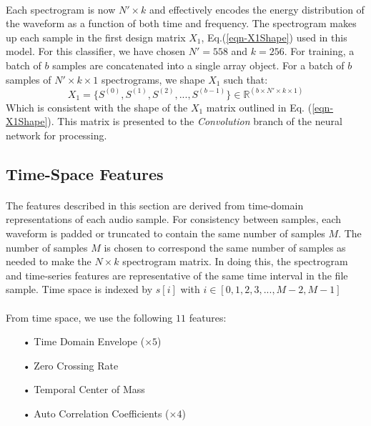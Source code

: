\documentclass[12pt,letterpaper]{article}
\begin{document}
\paragraph*{}Each spectrogram is now $N' \times k$ and effectively encodes the energy distribution of the waveform as a function of both time and frequency. The spectrogram makes up each sample in the first design matrix $X_1$, Eq.(\ref{eqn-X1Shape}) used in this model. For this classifier, we have chosen $N' = 558$ and $k = 256$. For training, a batch of $b$ samples are concatenated into a single array object. For a batch of $b$ samples of $N' \times k \times 1$ spectrograms, we shape $X_1$ such that:
\begin{equation}
\label{eqn-X1}
X_1 = \big\{ S^{(0)},S^{(1)},S^{(2)}, ... , S^{(b-1)} \big\} \in \mathbb{R}^{(b \times N' \times k \times 1)}
\end{equation}
Which is consistent with the shape of the $X_1$ matrix outlined in Eq. (\ref{eqn-X1Shape}). This matrix is presented to the \textit{Convolution} branch of the neural network for processing.


\subsection{Time-Space Features}
\label{subsec-TimeFeatures}

\paragraph*{}The features described in this section are derived from time-domain representations of each audio sample.  For consistency between samples, each waveform is padded or truncated to contain the same number of samples $M$. The number of samples $M$ is chosen to correspond the same number of samples as needed to make the $N \times k$ spectrogram matrix. In doing this, the spectrogram and time-series features are representative of the same time interval in the file sample. Time space is indexed by $s[i]$ with $i \in [0,1,2,3,...,M-2,M-1]$

\paragraph*{}From time space, we use the following $11$ features:
\begin{itemize}
\item[•] Time Domain Envelope ($\times 5$)
\item[•] Zero Crossing Rate
\item[•] Temporal Center of Mass
\item[•] Auto Correlation Coefficients ($\times 4$)
\end{itemize}
\end{document}
